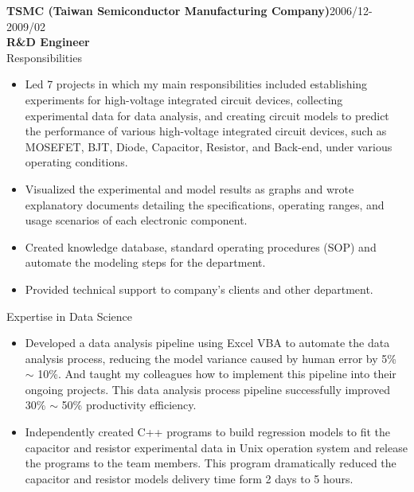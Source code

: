 \documentclass[margin, 10pt]{res} %
\begin{document}
\begin{resume}
\textbf{TSMC (Taiwan Semiconductor Manufacturing Company)}\hfill{2006/12-2009/02}\\
\textbf{R\&D Engineer}\\
\textrm{Responsibilities}
\begin{itemize}
    \item Led 7 projects in which my main responsibilities included establishing experiments for high-voltage integrated circuit devices, collecting experimental data for data analysis, and creating circuit models to predict the performance of various high-voltage integrated circuit devices, such as MOSEFET, BJT, Diode, Capacitor, Resistor, and Back-end, under various operating conditions.
    \item Visualized the experimental and model results as graphs and wrote explanatory documents detailing the specifications, operating ranges, and usage scenarios of each electronic component.
    \item Created knowledge database, standard operating procedures (SOP) and automate the modeling steps for the department.
    \item Provided technical support to company’s clients and other department.
\end{itemize}
\textrm{Expertise in Data Science}
\begin{itemize}
    \item Developed a data analysis pipeline using Excel VBA to automate the data analysis process, reducing the model variance caused by human error by 5\% $\sim$ 10\%. And taught my colleagues how to implement this pipeline into their ongoing projects. This data analysis process pipeline successfully improved 30\% $\sim$ 50\% productivity efficiency.
    \item Independently created C++ programs to build regression models to fit the capacitor and resistor experimental data in Unix operation system and release the programs to the team members. This program dramatically reduced the capacitor and resistor models delivery time form 2 days to 5 hours.

\end{itemize}
\end{resume}
\end{document}
